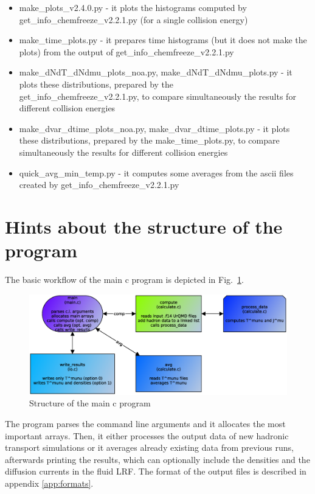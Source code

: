 \documentclass[12pt, a4paper]{article}
\begin{document}
\begin{itemize}
	\item make\_plots\_v2.4.0.py - it plots the histograms computed by\\get\_info\_chemfreeze\_v2.2.1.py (for a single collision energy)
	
	\item make\_time\_plots.py - it prepares time histograms (but it does not make the plots) from the output of get\_info\_chemfreeze\_v2.2.1.py
	
	\item make\_dNdT\_dNdmu\_plots\_noa.py, make\_dNdT\_dNdmu\_plots.py - it plots these distributions, prepared by the\\get\_info\_chemfreeze\_v2.2.1.py, to compare simultaneously the results for different collision energies
	
	\item make\_dvar\_dtime\_plots\_noa.py, make\_dvar\_dtime\_plots.py - it plots these distributions, prepared by the make\_time\_plots.py, to compare simultaneously the results for different collision energies
	
	\item quick\_avg\_min\_temp.py - it computes some averages from the ascii files created by get\_info\_chemfreeze\_v2.2.1.py
	
\end{itemize}
	
\section{Hints about the structure of the program}
The basic workflow of the main c program is depicted in Fig.~\ref{fig:workflow}.\\

\begin{figure}[!h]
	\includegraphics[width=\linewidth]{img/flow.eps}
	\caption{Structure of the main c program}
	\label{fig:workflow}
\end{figure}
The program parses the command line arguments and it allocates the most important arrays. Then, it either processes the output data of new hadronic transport simulations or it averages already existing data from previous runs, afterwards printing the results, which can optionally include the densities and the diffusion currents in the fluid LRF. The format of the output files is described in appendix \ref{app:formats}.\\
\end{document}
